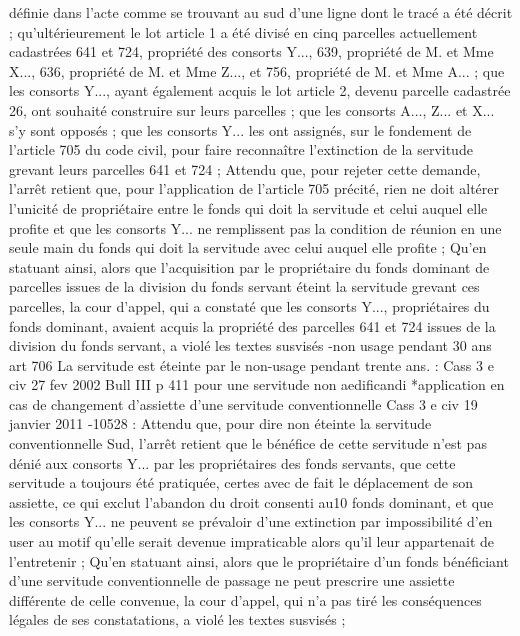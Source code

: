 \documentclass[11pt,a4paper]{report}
\begin{document}
	définie dans l'acte comme se trouvant au sud d'une ligne dont le tracé a été décrit ; qu'ultérieurement le lot
	article 1 a été divisé en cinq parcelles actuellement cadastrées 641 et 724, propriété des consorts Y..., 639,
	propriété de M. et Mme X..., 636, propriété de M. et Mme Z..., et 756, propriété de M. et Mme A... ; que les
	consorts Y..., ayant également acquis le lot article 2, devenu parcelle cadastrée 26, ont souhaité construire sur
	leurs parcelles ; que les consorts A..., Z... et X... s'y sont opposés ; que les consorts Y... les ont assignés, sur le
	fondement de l'article 705 du code civil, pour faire reconnaître l'extinction de la servitude grevant leurs
	parcelles 641 et 724 ;
	Attendu que, pour rejeter cette demande, l'arrêt retient que, pour l'application de l'article 705 précité, rien ne
	doit altérer l'unicité de propriétaire entre le fonds qui doit la servitude et celui auquel elle profite et que les
	consorts Y... ne remplissent pas la condition de réunion en une seule main du fonds qui doit la servitude avec
	celui auquel elle profite ;
	Qu'en statuant ainsi, alors que l'acquisition par le propriétaire du fonds dominant de parcelles issues de la
	division du fonds servant éteint la servitude grevant ces parcelles, la cour d'appel, qui a constaté que les
	consorts Y..., propriétaires du fonds dominant, avaient acquis la propriété des parcelles 641 et 724 issues de la
	division du fonds servant, a violé les textes susvisés
	-non usage pendant 30 ans art 706 La servitude est éteinte par le non-usage pendant trente ans. :
	Cass 3 e civ 27 fev 2002 Bull III  p 411 pour une servitude non aedificandi
	*application en cas de changement d’assiette d’une servitude conventionnelle Cass 3 e civ 19 janvier 2011 -10528
	: Attendu que, pour dire non éteinte la servitude conventionnelle Sud, l'arrêt retient que le bénéfice de cette
	servitude n'est pas dénié aux consorts Y... par les propriétaires des fonds servants, que cette servitude a toujours
	été pratiquée, certes avec de fait le déplacement de son assiette, ce qui exclut l'abandon du droit consenti au10
	fonds dominant, et que les consorts Y... ne peuvent se prévaloir d'une extinction par impossibilité d'en user au
	motif qu'elle serait devenue impraticable alors qu'il leur appartenait de l'entretenir ;
	Qu'en statuant ainsi, alors que le propriétaire d'un fonds bénéficiant d'une servitude conventionnelle de passage
	ne peut prescrire une assiette différente de celle convenue, la cour d'appel, qui n'a pas tiré les conséquences
	légales de ses constatations, a violé les textes susvisés ;
\end{document}
